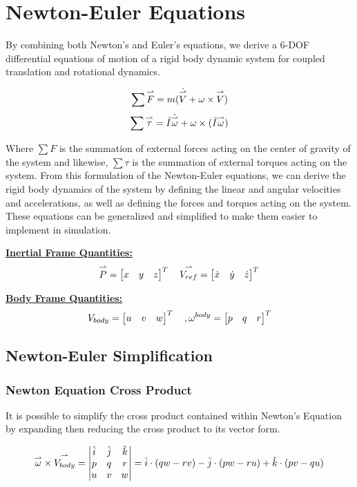 \newpage

\section{Newton-Euler Equations}
By combining both Newton's and Euler's equations, we derive a 6-DOF differential equations of motion of a rigid body dynamic system for coupled translation and rotational dynamics. 

$$\sum\overset{\rightharpoonup}{F} =  m(\dot{\overset{\rightharpoonup}{V}} + \omega \times \overset{\rightharpoonup}{V})$$
$$\sum\overset{\rightharpoonup}{\tau} = \tilde{I}\dot{\overset{\rightharpoonup}{\omega}} + \omega \times (\tilde{I}\overset{\rightharpoonup}{\omega})$$

Where $\sum F$ is the summation of external forces acting on the center of gravity of the system and likewise, $\sum \tau$ is the summation of external torques acting on the system. From this formulation of the Newton-Euler equations, we can derive the rigid body dynamics of the system by defining the linear and angular velocities and accelerations, as well as defining the forces and torques acting on the system. \\

These equations can be generalized and simplified to make them easier to implement in simulation. 

\newline
\underline{\textbf{Inertial Frame Quantities:}}
$$\overset{\rightharpoonup}{P} = \begin{bmatrix} x & y & z \end{bmatrix}^{T} \quad \overset{\rightharpoonup}{V_{ref}} = \begin{bmatrix} \dot{x} & \dot{y} & \dot{z} \end{bmatrix}^{T}$$

\underline{\textbf{Body Frame Quantities:}}
$$ V_{body} = \begin{bmatrix} u & v & w \end{bmatrix}^{T} \quad , \omega^{body} = \begin{bmatrix} p & q & r \end{bmatrix}^{T}$$

\subsection{Newton-Euler Simplification}


\subsubsection{Newton Equation Cross Product}

It is possible to simplify the cross product contained within Newton's Equation by expanding then reducing the cross product to its vector form. 

$$\overset{\rightharpoonup}{\omega} \times \overset{\rightharpoonup}{V_{body}} = \begin{vmatrix}
    \hat{i} & \hat{j} & \hat{k}\\ 
    p & q & r\\
    u & v & w 
\end{vmatrix} = \hat{i} \cdot (q w - r v) - \hat{j} \cdot (p w - r u) +\hat{k} \cdot (p v - q u)$$

